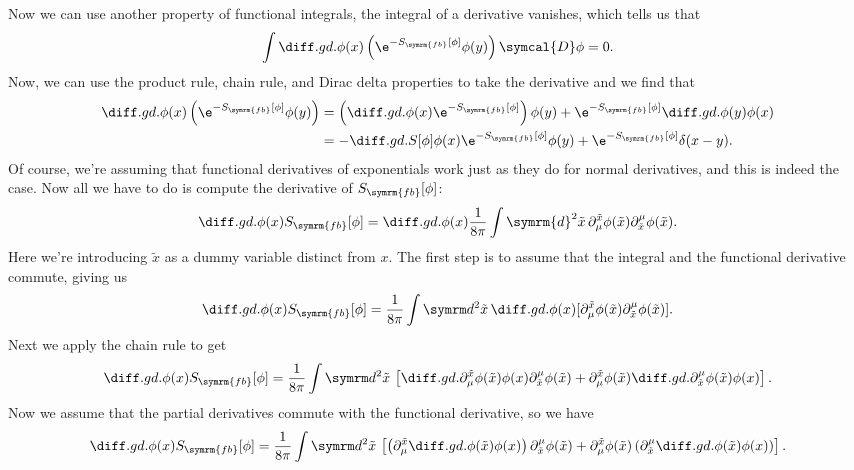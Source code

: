 \documentclass[fleqn]{NotesClass}
\renewcommand{\dl}[1]{\symrm{d}#1}
\newcommand{\DL}{\symcal{D}}
\newcommand{\freeboson}{\symrm{fb}}
\begin{document}
    Now we can use another property of functional integrals, the integral of a derivative vanishes, which tells us that
    \begin{equation}
        \label{eqn:free boson 2-correlator step 1}
        \int \diffd{}{\phi(x)} \left( \e^{-S_{\freeboson}[\phi]}\phi(y) \right) \DL\phi = 0.
    \end{equation}
    Now, we can use the product rule, chain rule, and Dirac delta properties to take the derivative and we find that
    \begin{align}
        \diffd{}{\phi(x)} \left( \e^{-S_{\freeboson}[\phi]} \phi(y) \right) &= \left( \diffd{}{\phi(x)} \e^{-S_{\freeboson}[\phi]} \right) \phi(y) + \e^{-S_{\freeboson}[\phi]} \diffd{\phi(y)}{\phi(x)}\\
        &= -\diffd{S[\phi]}{\phi(x)} \e^{-S_{\freeboson}[\phi]} \phi(y) + \e^{-S_{\freeboson}[\phi]} \delta(x - y).
    \end{align}
    Of course, we're assuming that functional derivatives of exponentials work just as they do for normal derivatives, and this is indeed the case.
    Now all we have to do is compute the derivative of \(S_{\freeboson}[\phi]\):
    \begin{equation}
        \diffd{}{\phi(x)} S_{\freeboson}[\phi] = \diffd{}{\phi(x)} \frac{1}{8\pi} \int \dl{^2\tilde{x}} \, \partial_\mu^{\tilde{x}} \phi(\tilde{x}) \partial^\mu_{\tilde{x}} \phi(\tilde{x}).
    \end{equation}
    Here we're introducing \(\tilde{x}\) as a dummy variable distinct from \(x\).
    The first step is to assume that the integral and the functional derivative commute, giving us
    \begin{equation}
        \diffd{}{\phi(x)} S_{\freeboson}[\phi] = \frac{1}{8\pi} \int \dl^2\tilde{x} \, \diffd{}{\phi(x)} [\partial_\mu^{\tilde{x}} \phi(\tilde{x}) \partial^\mu_{\tilde{x}} \phi(\tilde{x})].
    \end{equation}
    Next we apply the chain rule to get
    \begin{equation}
        \diffd{}{\phi(x)} S_{\freeboson}[\phi] = \frac{1}{8\pi} \int \dl^2\tilde{x} \, \left[ \diffd{\partial_\mu^{\tilde{x}} \phi(\tilde{x})}{\phi(x)} \partial^\mu_{\tilde{x}}\phi(\tilde{x}) + \partial_\mu^{\tilde{x}}\phi(\tilde{x}) \diffd{\partial^\mu_{\tilde{x}}\phi(\tilde{x})}{\phi(x)} \right].
    \end{equation}
    Now we assume that the partial derivatives commute with the functional derivative, so we have
    \begin{equation}
        \diffd{}{\phi(x)} S_{\freeboson}[\phi] = \frac{1}{8\pi} \int \dl^2\tilde{x} \, \left[ \left( \partial_\mu^{\tilde{x}} \diffd{\phi(\tilde{x})}{\phi(x)} \right) \partial^\mu_{\tilde{x}}\phi(\tilde{x}) + \partial_\mu^{\tilde{x}}\phi(\tilde{x}) \left(\partial^\mu_{\tilde{x}} \diffd{\phi(\tilde{x})}{\phi(x)} \right) \right].
    \end{equation}
\end{document}
